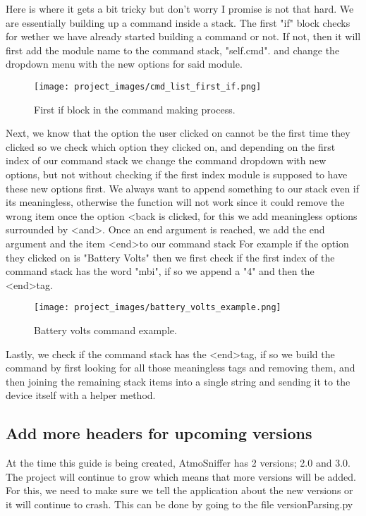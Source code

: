 	Here is where it gets a bit tricky but don't worry I promise is not that hard. We are essentially building up a command inside a stack. The first "if" block checks for wether we have already started building a command or not. If not, then it will first add the module name to the command stack, "self.cmd". and change the dropdown menu with the new options for said module.

\begin{figure}[H]
\centering
\texttt{[image: project\_images/cmd\_list\_first\_if.png]}
 \caption{First if block in the command making process.}
 \label{fig:cmd list first if}
\end{figure}

	Next, we know that the option the user clicked on cannot be the first time they clicked so we check which option they clicked on, and depending on the first index of our command stack we change the command dropdown with new options, but not without checking if the first index module is supposed to have these new options first.
	We always want to append something to our stack even if its meaningless, otherwise the function will not work since it could remove the wrong item once the option \textless back is clicked, for this we add meaningless options surrounded by \textless and\textgreater.
	Once an end argument is reached, we add the end argument and the item \textless end\textgreater to our command stack
	For example if the option they clicked on is "Battery Volts" then we first check if the first index of the command stack has the word "mbi", if so we append a "4" and then the \textless end\textgreater tag.

\begin{figure}[H]
\centering
\texttt{[image: project\_images/battery\_volts\_example.png]}
 \caption{Battery volts command example.}
 \label{fig:battery volts example}
\end{figure}
	
	Lastly, we check if the command stack has the \textless end\textgreater tag, if so we build the command by first looking for all those meaningless tags and removing them, and then joining the remaining stack items into a single string and sending it to the device itself with a helper method.

\subsection{Add more headers for upcoming versions}

	At the time this guide is being created, AtmoSniffer has 2 versions; 2.0 and 3.0. The project will continue to grow which means that more versions will be added.
	For this, we need to make sure we tell the application about the new versions or it will continue to crash. This can be done by going to the file versionParsing.py

